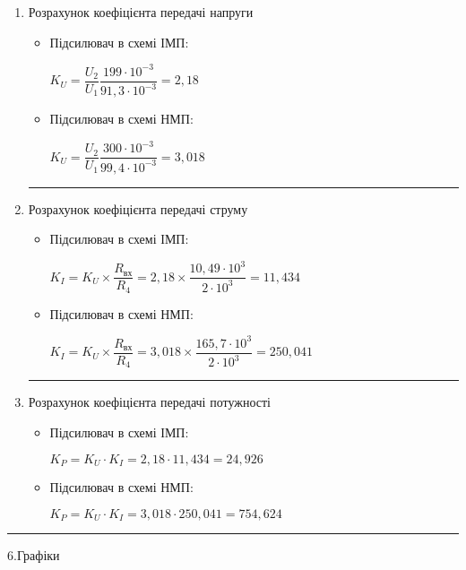 \documentclass[14pt,a4paper]{scrartcl}
\begin{document}
\begin{enumerate}
\item Розрахунок коефіцієнта передачі напруги

\begin{itemize}
\item Підсилювач в схемі ІМП:
\begin{center}
$K_U=\dfrac{U_2}{U_1}\dfrac{199\cdot{10^{-3}}}{91,3\cdot{10^{-3}}}=2,18$\\[1cm]
\end{center}

\item Підсилювач в схемі НМП:
\begin{center}
$K_U=\dfrac{U_2}{U_1}\dfrac{300\cdot{10^{-3}}}{99,4\cdot{10^{-3}}}=3,018$
\end{center}
\end{itemize}
\medskip\hrule\medskip

\item Розрахунок коефіцієнта передачі струму

\begin{itemize}
\item Підсилювач в схемі ІМП:
\begin{center}
$K_I=K_U\times{\dfrac{R_{\text{вх}}}{R_4}}=2,18\times{\dfrac{10,49\cdot{10^3}}{2\cdot{10^3}}}=11,434$\\
\end{center}

\item Підсилювач в схемі НМП:
\begin{center}
$K_I=K_U\times{\dfrac{R_{\text{вх}}}{R_4}}=3,018\times{\dfrac{165,7\cdot{10^3}}{2\cdot{10^3}}}=250,041$
\end{center}
\end{itemize}
\medskip\hrule\medskip
\newpage

\item Розрахунок коефіцієнта передачі потужності

\begin{itemize}
\item Підсилювач в схемі ІМП:
\begin{center}
$K_P=K_U\cdot{K_I}=2,18\cdot{11,434}=24,926$\\
\end{center}

\item Підсилювач в схемі НМП:
\begin{center}
$K_P=K_U\cdot{K_I}=3,018\cdot{250,041}=754,624$
\end{center}
\end{itemize}
\end{enumerate}
\medskip\hrule\medskip
\begin{center}
{\Large 6.Графіки}
\end{center}
\end{document}
